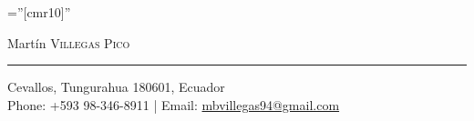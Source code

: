 \documentclass[a4paper,10.9pt]{article}
\begin{document}
  




\font\fb=''[cmr10]'' %


\begin{center}
{ \Huge Martín \textsc{Villegas Pico}}
\end{center}
\textcolor{black!30}{\rule[.1\baselineskip]{\textwidth}{1pt}}

\begin{center}
Cevallos, Tungurahua 180601, Ecuador\\
Phone: +593 98-346-8911 | Email: \href{mailto:mbvillegas94@gmail.com}{mbvillegas94@gmail.com}
\end{center}


%

\end{document}
